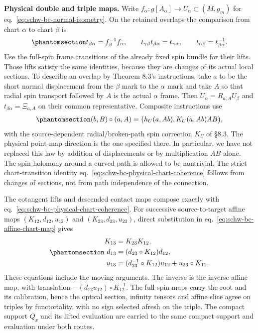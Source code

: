\documentclass[
  english,
  11pt,
  reqno]{amsart}
\begin{document}
\textbf{Physical double and triple maps.} Write
\(f_\alpha:g[A_\alpha]\to U_\alpha\subset(M,g_m)\) for
eq.~\ref{eq:schw-bc-normal-isometry}. On the retained overlaps the
comparison from chart \(\alpha\) to chart \(\beta\) is
\begin{equation}\protect\phantomsection\label{eq:schw-bc-physical-chart-coherence}{
 t_{\beta\alpha}=f_\beta^{-1}f_\alpha,\qquad
 t_{\gamma\beta}t_{\beta\alpha}=t_{\gamma\alpha},\qquad
 t_{\alpha\beta}=t_{\beta\alpha}^{-1}.
}\end{equation} Use the full-spin frame transitions of the already fixed
spin bundle for their lifts. Those lifts satisfy the same identities,
because they are changes of its actual local sections. To describe an
overlap by Theorem 8.3's instructions, take \(a\) to be the short normal
displacement from the \(\beta\) mark to the \(\alpha\) mark and take
\(A\) so that radial spin transport followed by \(A\) is the actual
\(\alpha\) frame. Then \(U_\alpha=R_{a,A}U_\beta\) and
\(t_{\beta\alpha}=\Xi_{a,A}\) on their common representative. Composite
instructions use
\begin{equation}\protect\phantomsection\label{eq:schw-bc-full-instruction-composition}{
 (b,B)\circ(a,A)
   =\bigl(h_U(a,Ab),K_U(a,Ab)AB\bigr),
}\end{equation} with the source-dependent radial/broken-path spin
correction \(K_U\) of §8.3. The physical point-map direction is the one
specified there. In particular, we have not replaced this law by
addition of displacements or by multiplication \(AB\) alone. The spin
holonomy around a curved path is allowed to be nontrivial. The strict
chart-transition identity eq.~\ref{eq:schw-bc-physical-chart-coherence}
follows from changes of sections, not from path independence of the
connection.

The cotangent lifts and descended contact maps compose exactly with
eq.~\ref{eq:schw-bc-physical-chart-coherence}. For successive
source-to-target affine maps \((K_{12},d_{12},u_{12})\) and
\((K_{23},d_{23},u_{23})\), direct substitution in
eq.~\ref{eq:schw-bc-affine-chart-map} gives
\begin{equation}\protect\phantomsection\label{eq:schw-bc-affine-coherence}{
 \begin{aligned}
 K_{13}&=K_{23}K_{12},\\
 d_{13}&=(d_{23}\circ K_{12})d_{12},\\
 u_{13}&=(d_{23}^{-1}\circ K_{12})u_{12}
                   +u_{23}\circ K_{12}.
 \end{aligned}
}\end{equation} These equations include the moving arguments. The
inverse is the inverse affine map, with translation
\(-(d_{12}u_{12})\circ K_{12}^{-1}\). The full-spin maps carry the root
and its calibration, hence the optical section, infinity tensors and
affine slice agree on triples by functoriality, with no sign selected
afresh on the triple. The compact support \(Q_x\) and its lifted
evaluation are carried to the same compact support and evaluation under
both routes.
\end{document}
